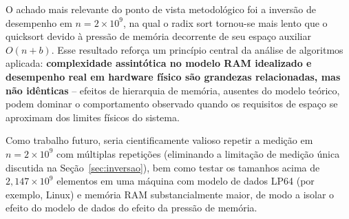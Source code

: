 \documentclass[
	12pt,
	oneside,
	a4paper,
	chapter=TITLE,
	section=TITLE,
	subsection=TITLE,
	subsubsection=TITLE,
	english,
	brazil
]{abntex2}
\theoremstyle{plain}
\theoremstyle{remark}
\renewcommand{\_}{\underscoreoriginal\allowbreak}
\begin{document}
O achado mais relevante do ponto de vista metodológico foi a inversão de desempenho em $n=2\times10^{9}$, na qual o radix sort tornou-se mais lento que o quicksort devido à pressão de memória decorrente de seu espaço auxiliar $O(n+b)$. Esse resultado reforça um princípio central da análise de algoritmos aplicada: \textbf{complexidade assintótica no modelo RAM idealizado e desempenho real em hardware físico são grandezas relacionadas, mas não idênticas} -- efeitos de hierarquia de memória, ausentes do modelo teórico, podem dominar o comportamento observado quando os requisitos de espaço se aproximam dos limites físicos do sistema.

Como trabalho futuro, seria cientificamente valioso repetir a medição em $n=2\times10^{9}$ com múltiplas repetições (eliminando a limitação de medição única discutida na Seção~\ref{sec:inversao}), bem como testar os tamanhos acima de $2{,}147\times10^{9}$ elementos em uma máquina com modelo de dados LP64 (por exemplo, Linux) e memória RAM substancialmente maior, de modo a isolar o efeito do modelo de dados do efeito da pressão de memória.

\postextual


\end{document}
